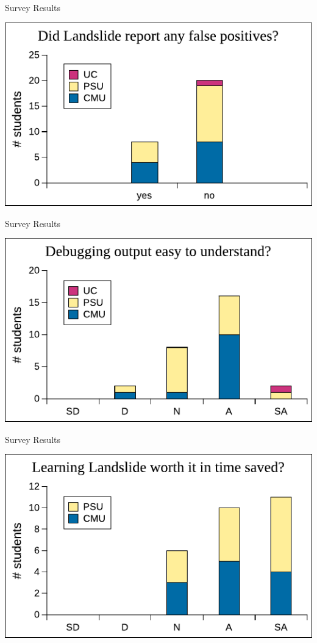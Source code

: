 \documentclass[xcolor=dvipsnames]{beamer}
\begin{document}
\begin{frame}{Survey Results} \begin{center} \includegraphics[width=\textwidth]{../survey4.pdf} \end{center} \end{frame}
\begin{frame}{Survey Results} \begin{center} \includegraphics[width=\textwidth]{../survey5.pdf} \end{center} \end{frame}
\begin{frame}{Survey Results} \begin{center} \includegraphics[width=\textwidth]{../survey7.pdf} \end{center} \end{frame}
\end{document}
